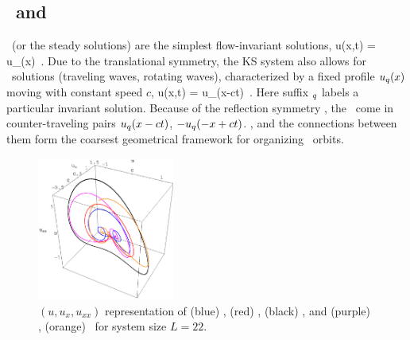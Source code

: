 \subsection{\Eqva\ and \reqva} %
\label{sec:stks}


\Eqva\  (or the steady solutions)
are the simplest flow-invariant solutions,
\beq
 u(x,t) = u_\stagn(x) %
\,.
Due to the translational symmetry,
the KS system also allows for \reqv\ solutions
(traveling waves, rotating waves),
characterized by a fixed profile $u_q(x)$
moving with constant speed $c$, {\ie}
\beq
 u(x,t) =  u_\stagn(x-ct) %
\,.
Here suffix ${}_q$ labels a particular invariant solution.
Because of the reflection symmetry ,
the \reqva\ come in counter-traveling pairs
$u_q(x-ct)$, $-u_q(-x+ct)$. %
\Eqva,  and
the connections between them form the
coarsest geometrical framework for organizing
\statesp\ orbits. %


\begin{figure}[t] \label{f:eqvSpatial}
\begin{center}
\includegraphics[width=0.4\textwidth]{figs/equilSpatial.eps}
\end{center}
\caption{
$(u,u_x,u_{xx})$ representation
of (blue) , (red) ,  (black)  \eqva,
 and (purple) , (orange)  \reqva\ for
system size $L=22$.
        }
\end{figure}


